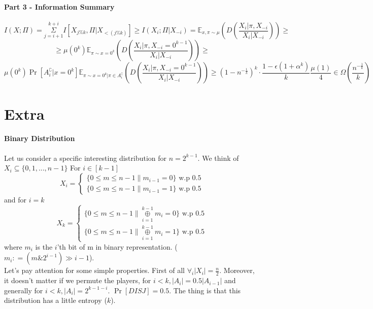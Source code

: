\documentclass{article}
\theoremstyle{plain}
\begin{document}
\paragraph{Part 3 - Information Summary}
\begin{equation*}
    I(X;\Pi) = \overset{k+i}{\underset{j=i+1}{\Sigma } } I[X_{j \% k}, \Pi | X_{<(j \% k)}] \geq I(X_i;\Pi | X_{-i}) = \mathbb{E}_{x, \pi \sim \mu} \left( D\left(\frac{X_i | \pi, X_{-i}}{X_i | X_{-i}} \right) \right) \geq
\end{equation*}
\begin{equation*}
    \geq \mu(0^k) \mathbb{E}_{\pi \sim x = 0^k} \left( D\left(\frac{X_i | \pi, X_{-i} = 0^{k-1}}{X_i | X_{-i}} \right) \right) \geq 
\end{equation*}
\begin{equation*}
\mu(0^k) \Pr[A_{i}^\complement| x = 0^k] \mathbb{E}_{\pi \sim x = 0^k| \pi \in A_{i}^\complement} \left( D\left(\frac{X_i | \pi, X_{-i} = 0^{k-1}}{X_i | X_{-i}} \right) \right) \geq \left (1 - n^{-\frac{1}{k}} \right)^{k} \cdot \frac{1 - \epsilon (1 + \alpha ^k)}{k} \frac{\mu(1)}{4} \in \Omega\left(\frac{n^{-\frac{1}{k}}}{k}\right)
\end{equation*}
\section{Extra}
\paragraph{Binary Distribution}
Let us consider a specific interesting distribution for $n = 2^{k-1}$. We think of $X_i \subseteq \{0, 1, ... , n-1\} $ \newline
For $i \in [k-1]$
  \[
    X_i=\left\{
                \begin{array}{ll}
                  \{0 \leq m \leq n-1 \| m_{i-1} = 0\} \text{ w.p 0.5} \\
                  \{0 \leq m \leq n-1 \| m_{i-1} = 1\} \text{ w.p 0.5}
                \end{array}
              \right.
  \]
and for $i = k$
  \[
    X_k=\left\{
                \begin{array}{ll}
                  \{0 \leq m \leq n-1 \| \underset{i=1}{\overset{k-1}{\oplus}} m_i = 0\} \text{ w.p 0.5} \\
                  \{0 \leq m \leq n-1 \| \underset{i=1}{\overset{k-1}{\oplus}} m_i = 1\} \text{ w.p 0.5}
                \end{array}
              \right.
  \]
where $m_i$ is the $i$'th bit of m in binary representation. ($m_i \mathrel{\mathop:}= ( m \mathop{\&} 2^{i-1} ) \gg i-1 $). \\
Let's pay attention for some simple properties. First of all $\forall_i |X_i| = \frac{n}{2}$. Moreover, it doesn't matter if we permute the players, for $i < k, |A_i| = 0.5|A_{i-1}|$ and generally for $i < k, |A_i| = 2^{k-1-i}$. $\Pr[DISJ] = 0.5$. The thing is that this distribution has a little entropy ($k$).
\end{document}
